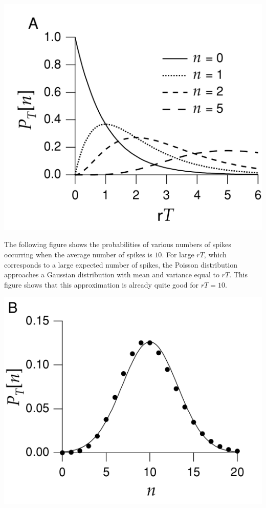 \begin{center}
  \label{fig:1.11}                
  \includegraphics[scale = 0.36]{png/Figure1-11-A}\\        
\end{center}

\begin{exm}
  The following figure shows the probabilities of various numbers of spikes occurring when the average number of spikes is $10$. For large $rT$, which corresponds to a large expected number of spikes, the Poisson distribution approaches a Gaussian distribution with mean and variance equal to $rT$. This figure shows that this approximation is already quite good for $rT = 10$.
\end{exm}    

\begin{center}
    \label{fig:1.12}            
    \includegraphics[scale = 0.36]{png/Figure1-11-B}\\    
\end{center}

